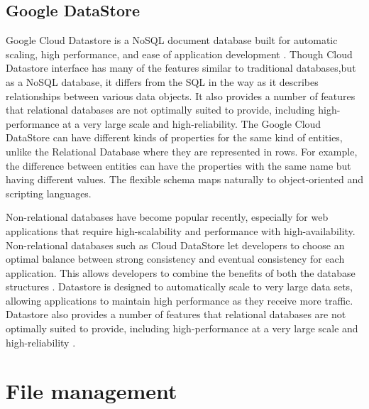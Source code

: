 {     \pv


\subsection{Google DataStore}

     Google Cloud Datastore is a NoSQL document database built for
     automatic scaling, high performance, and ease of application
     development \cite{www-google-datastore}. Though Cloud Datastore
     interface has many of the features similar to traditional
     databases,but as a NoSQL database, it differs from the SQL in the
     way as it describes relationships between various data
     objects. It also provides a number of features that relational
     databases are not optimally suited to provide, including
     high-performance at a very large scale and high-reliability. The
     Google Cloud DataStore can have different kinds of properties for
     the same kind of entities, unlike the Relational Database where
     they are represented in rows. For example, the difference between
     entities can have the properties with the same name but having
     different values. The flexible schema maps naturally to
     object-oriented and scripting languages.

     Non-relational databases have become popular recently, especially
     for web applications that require high-scalability and
     performance with high-availability. Non-relational databases such
     as Cloud DataStore let developers to choose an optimal balance
     between strong consistency and eventual consistency for each
     application. This allows developers to combine the benefits of
     both the database structures \cite{www-google-datastore-2}.
     Datastore is designed to automatically scale to very large data
     sets, allowing applications to maintain high performance as they
     receive more traffic. Datastore also provides a number of
     features that relational databases are not optimally suited to
     provide, including high-performance at a very large scale and
     high-reliability \cite{www-google-datastore}.

\section{File management}
\label{S:o-file-management}


}
